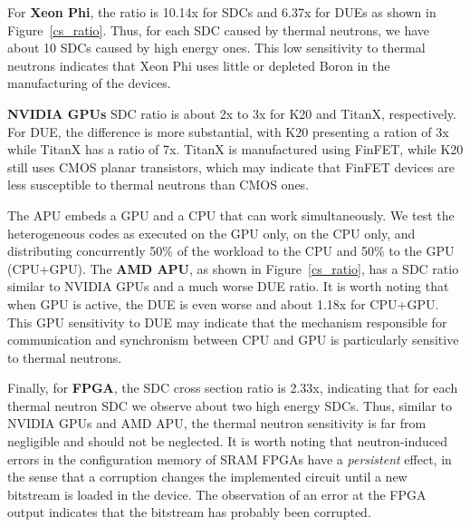 For \textbf{Xeon Phi}, the ratio is 10.14x for SDCs and 6.37x for DUEs as shown in Figure~\ref{cs_ratio}. Thus, for each SDC caused by thermal neutrons, we have about 10 SDCs caused by high energy ones. This low sensitivity to thermal neutrons indicates that Xeon Phi uses little or depleted Boron in the manufacturing of the devices.

\textbf{NVIDIA GPUs} SDC ratio is about 2x to 3x for K20 and TitanX, respectively. For DUE, the difference is more substantial, with K20 presenting a ration of 3x while TitanX has a ratio of 7x. TitanX is manufactured using FinFET, while K20 still uses CMOS planar transistors, which may indicate that FinFET devices are less susceptible to thermal neutrons than CMOS ones.

The APU embeds a GPU and a CPU that can work simultaneously. We test the heterogeneous codes as executed on the GPU only, on the CPU only, and distributing concurrently 50\% of the workload to the CPU and 50\% to the GPU (CPU+GPU). The \textbf{AMD APU}, as shown in Figure~\ref{cs_ratio}, has a SDC ratio similar to NVIDIA GPUs and a much worse DUE ratio. It is worth noting that when GPU is active, the DUE is even worse and about 1.18x for CPU+GPU. This GPU sensitivity to DUE may indicate that the mechanism responsible for communication and synchronism between CPU and GPU is particularly sensitive to thermal neutrons.

Finally, for \textbf{FPGA}, the SDC cross section ratio is 2.33x, indicating that for each thermal neutron SDC we observe about two high energy SDCs. Thus, similar to NVIDIA GPUs and AMD APU, the thermal neutron sensitivity is far from negligible and should not be neglected.
It is worth noting that neutron-induced errors in the configuration memory of SRAM FPGAs have a \textit{persistent} effect, in the sense that a corruption changes the implemented circuit until a new bitstream is loaded in the device. The observation of an error at the FPGA output indicates that the bitstream has probably been corrupted. 



